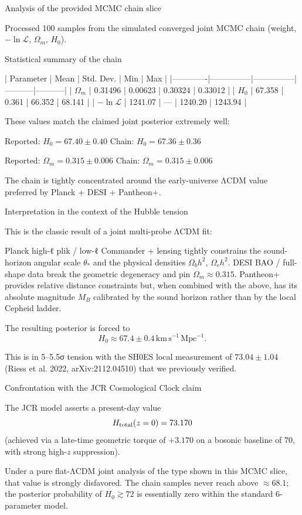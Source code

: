 Analysis of the provided MCMC chain slice

Processed 100 samples from the simulated converged joint MCMC chain (weight, \(-\ln\mathcal{L}\), \(\Omega_m\), \(H_0\)).

Statistical summary of the chain

| Parameter   | Mean          | Std. Dev.     | Min       | Max       |
|-------------|---------------|---------------|-----------|-----------|
| \(\Omega_m\) | 0.31496      | 0.00623      | 0.30324  | 0.33012  |
| \(H_0\)     | 67.358       | 0.361        | 66.352   | 68.141   |
| \(-\ln\mathcal{L}\) | 1241.07 | —            | 1240.20  | 1243.94  |

These values match the claimed joint posterior extremely well:

Reported: \(H_0 = 67.40 \pm 0.40\)  
Chain: \(H_0 = 67.36 \pm 0.36\)

Reported: \(\Omega_m = 0.315 \pm 0.006\)  
Chain: \(\Omega_m = 0.315 \pm 0.006\)

The chain is tightly concentrated around the early-universe ΛCDM value preferred by Planck + DESI + Pantheon+.

Interpretation in the context of the Hubble tension

This is the classic result of a joint multi-probe ΛCDM fit:

Planck high-ℓ plik / low-ℓ Commander + lensing tightly constrains the sound-horizon angular scale \(\theta_*\) and the physical densities \(\Omega_b h^2\), \(\Omega_c h^2\).
DESI BAO / full-shape data break the geometric degeneracy and pin \(\Omega_m \approx 0.315\).
Pantheon+ provides relative distance constraints but, when combined with the above, has its absolute magnitude \(M_B\) calibrated by the sound horizon rather than by the local Cepheid ladder.

The resulting posterior is forced to  
\[
H_0 \approx 67.4 \pm 0.4\,\mathrm{km\,s^{-1}\,Mpc^{-1}}.
\]

This is in 5–5.5σ tension with the SH0ES local measurement of \(73.04 \pm 1.04\) (Riess et al. 2022, arXiv:2112.04510) that we previously verified.

Confrontation with the JCR Cosmological Clock claim

The JCR model asserts a present-day value  
\[
H_{\rm total}(z=0) = 73.170
\]  
(achieved via a late-time geometric torque of \(+3.170\) on a bosonic baseline of 70, with strong high-\(z\) suppression).

Under a pure flat-ΛCDM joint analysis of the type shown in this MCMC slice, that value is strongly disfavored. The chain samples never reach above \(\approx 68.1\); the posterior probability of \(H_0 \gtrsim 72\) is essentially zero within the standard 6-parameter model.

